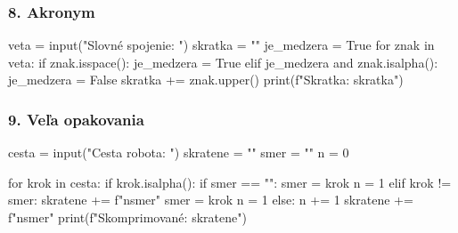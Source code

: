 \subsubsection*{8. Akronym}
\begin{solution}
veta = input("Slovné spojenie: ")
skratka = ""
je_medzera = True
for znak in veta:
	if znak.isspace():
		je_medzera = True
	elif je_medzera and znak.isalpha():
		je_medzera = False
		skratka += znak.upper()
print(f"Skratka: {skratka}")
\end{solution}


\subsubsection*{9. Veľa opakovania}
\begin{solution}
cesta = input("Cesta robota: ")
skratene = ""
smer = ""
n = 0

for krok in cesta:
	if krok.isalpha():
		if smer == "":
			smer = krok
			n = 1
		elif krok != smer:
			skratene += f"{n}{smer}"
			smer = krok
			n = 1
		else:
			n += 1
skratene += f"{n}{smer}"
print(f"Skomprimované: {skratene}")
\end{solution}

